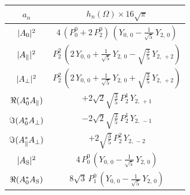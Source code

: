 \begin{table}[t]
  \centering
  \renewcommand{\arraystretch}{1.2}
  \begin{tabular}{cc}
    \hline
      $a_n$  &
      $h_n(\Omega) \times 16\sqrt{\pi}$       \\ %

    \hline
      $|{A}_{0}|^2$   &
      $4\, (P_0^0 + 2\, P_2^0)\, (Y_{0,\,0} - \tfrac{1}{\sqrt{5}}\, Y_{2,\,0})$  \\ %

    $|{A}_{\parallel}|^2$  &
      $P_2^2\, (2\, Y_{0,\,0} + \tfrac{1}{\sqrt{5}}\, Y_{2,\,0} - \sqrt{\tfrac{3}{5}}\, Y_{2,\,+2})$ \\ %

    $|{A}_{\perp}|^2$  &
      $P_2^2\, (2\, Y_{0,\,0} + \tfrac{1}{\sqrt{5}}\, Y_{2,\,0} + \sqrt{\tfrac{3}{5}}\, Y_{2,\,+2})$  \\ %

    $\Re({A}_{0}^* {A}_{\parallel})$  &
      $+2\sqrt{2}\sqrt{\tfrac{3}{5}}\, P_2^1\, Y_{2,\,+1}$  \\ %

    $\Im({A}_{0}^* {A}_{\perp})$  &
      $-2\sqrt{2}\sqrt{\tfrac{3}{5}}\, P_2^1\, Y_{2,\,-1}$  \\ %


    $\Im({A}_{\parallel}^* {A}_{\perp})$  &
      $+2\sqrt{\tfrac{3}{5}}\, P_2^2\, Y_{2,\,-2}$  \\ %

    \hline
    $|{A}_{{\text{S}}}|^2$  &
      $4\, P_0^0\, (Y_{0,\,0} - \tfrac{1}{\sqrt{5}}\, Y_{2,\,0})$  \\ %

    $\Re({A}_{0}^* {A}_{{\text{S}}})$  &
      $8\sqrt{3}\, P_1^0\, (Y_{0,\,0} - \tfrac{1}{\sqrt{5}}\, Y_{2,\,0})$ \\ %


\end{tabular}
\end{table}

